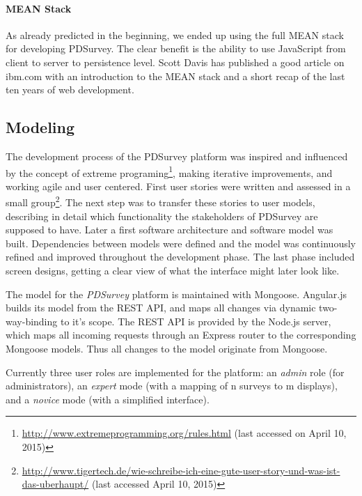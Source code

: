 		\paragraph{MEAN Stack}
		As already predicted in the beginning, we ended up using the full MEAN stack for developing PDSurvey. The clear benefit is the ability to use JavaScript from client to server to persistence level. Scott Davis has published a good article on ibm.com with an introduction to the MEAN stack and a short recap of the last ten years of web development\cite{Scott2014MEANStack}.






\clearpage

\subsection{Modeling}
\label{sec:implementation:modeling}

	The development process of the PDSurvey platform was inspired and influenced by the concept of extreme programing\footnote{\url{http://www.extremeprogramming.org/rules.html} (last accessed on April 10, 2015)}, making iterative improvements, and working agile and user centered. First user stories were written and assessed in a small group\footnote{\url{http://www.tigertech.de/wie-schreibe-ich-eine-gute-user-story-und-was-ist-das-uberhaupt/} (last accessed April 10, 2015)}. The next step was to transfer these stories to user models, describing in detail which functionality the stakeholders of PDSurvey are supposed to have. Later a first software architecture and software model was built. Dependencies between models were defined and the model was continuously refined and improved throughout the development phase. The last phase included screen designs, getting a clear view of what the interface might later look like.

	The model for the \textit{PDSurvey} platform is maintained with Mongoose. Angular.js builds its model from the REST API, and maps all changes via dynamic two-way-binding to it's scope. The REST API is provided by the Node.js server, which maps all incoming requests through an Express router to the corresponding Mongoose models. Thus all changes to the model originate from Mongoose.

	Currently three user roles are implemented for the platform: an \textit{admin} role (for administrators), an \textit{expert} mode (with a mapping of n surveys to m displays), and a \textit{novice} mode (with a simplified interface).

